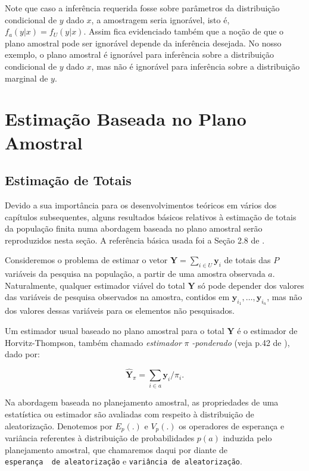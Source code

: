 \documentclass[]{book}
\theoremstyle{definition}
\theoremstyle{definition}
\theoremstyle{definition}
\theoremstyle{remark}
\begin{document}
Note que caso a inferência requerida fosse sobre parâmetros da
distribuição condicional de \(y\) dado \(x\), a amostragem seria
ignorável, isto é, \(f_a ( y | x) = f_U (y | x)\). Assim fica
evidenciado também que a noção de que o plano amostral pode ser
ignorável depende da inferência desejada. No nosso exemplo, o plano
amostral é ignorável para inferência sobre a distribuição condicional de
\(y\) dado \(x\), mas não é ignorável para inferência sobre a
distribuição marginal de \(y\).

\chapter{Estimação Baseada no Plano Amostral}\label{capplanamo}

\section{Estimação de Totais}\label{estimatotais}

Devido a sua importância para os desenvolvimentos teóricos em vários dos
capítulos subsequentes, alguns resultados básicos relativos à estimação
de totais da população finita numa abordagem baseada no plano amostral
serão reproduzidos nesta seção. A referência básica usada foi a Seção
2.8 de \citep{SSW92}.

Consideremos o problema de estimar o vetor
\(\mathbf{Y}=\sum_{i \in U}\mathbf{y}_i\) de totais das \(P\) variáveis
da pesquisa na população, a partir de uma amostra observada \(a\).
Naturalmente, qualquer estimador viável do total \(\mathbf{Y}\) só pode
depender dos valores das variáveis de pesquisa observados na amostra,
contidos em \(\mathbf{y}_{i_{1}}, \ldots , \mathbf{y}_{i_{n}}\), mas não
dos valores dessas variáveis para os elementos não pesquisados.

Um estimador usual baseado no plano amostral para o total \(\mathbf{Y}\)
é o estimador de Horvitz-Thompson, também chamado \emph{estimador}
\(\pi\) \emph{-ponderado} (veja p.42 de \citep{SSW92}), dado por:

\begin{equation}
\hat{\mathbf{Y}}_\pi = \sum_{i \in a} \mathbf{y}_i / \pi_{i} . \label{eq:estpa1}
\end{equation}

Na abordagem baseada no planejamento amostral, as propriedades de uma
estatística ou estimador são avaliadas com respeito à distribuição de
aleatorização. Denotemos por \(E_p(.)\) e \(V_p(.)\) os operadores de
esperança e variância referentes à distribuição de probabilidades
\(p(a)\) induzida pelo planejamento amostral, que chamaremos daqui por
diante de \texttt{esperança\ \ de\ aleatorização} e
\texttt{variância\ de\ aleatorização}.
\end{document}
